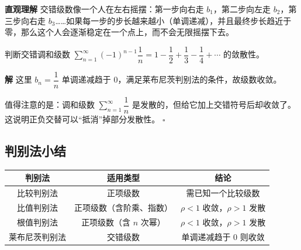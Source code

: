\documentclass[fontset=fandol]{ctexart}
\newenvironment{solution}{\par\noindent\textbf{解}\quad}{\hfill$\square$\par\vspace{0.8em}}
\newenvironment{intuition}{\par\noindent\textbf{直观理解}\quad}{\par\vspace{0.8em}}
\begin{document}
\begin{intuition}
交错级数像一个人在左右摇摆：第一步向右走 \(b_1\)，第二步向左走 \(b_2\)，第三步向右走 \(b_3\)……如果每一步的步长越来越小（单调递减），并且最终步长趋近于零，那么这个人会逐渐稳定在一个点上，而不会无限摇摆下去。
\end{intuition}

\begin{example}
判断交错调和级数 \(\sum\limits_{n=1}^{\infty} (-1)^{n-1} \dfrac{1}{n} = 1 - \dfrac12 + \dfrac13 - \dfrac14 + \cdots\) 的敛散性。
\end{example}
\begin{solution}
这里 \(b_n = \dfrac{1}{n}\) 单调递减趋于 0，满足莱布尼茨判别法的条件，故级数收敛。

值得注意的是：调和级数 \(\sum \limits_{n=1}^{\infty}\dfrac{1}{n}\) 是发散的，但给它加上交错符号后却收敛了。这说明正负交替可以“抵消”掉部分发散性。
\end{solution}


\subsection*{判别法小结}

\begin{tabular}{|c|c|c|}
\hline
\textbf{判别法} & \textbf{适用类型} & \textbf{结论} \\
\hline
比较判别法 & 正项级数 & 需已知一个比较级数 \\
\hline
比值判别法 & 正项级数（含阶乘、指数） & \(\rho < 1\) 收敛，\(\rho > 1\) 发散 \\
\hline
根值判别法 & 正项级数（含 \(n\) 次幂） & \(\rho < 1\) 收敛，\(\rho > 1\) 发散 \\
\hline
莱布尼茨判别法 & 交错级数 & 单调递减趋于 0 则收敛 \\
\hline
\end{tabular}
\end{document}
